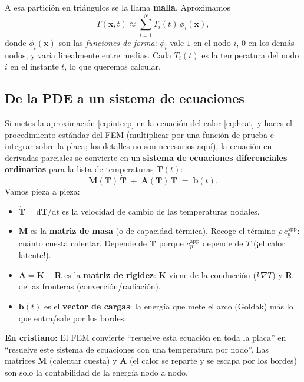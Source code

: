 \documentclass[11pt]{article}
\newcommand{\dd}{\mathrm{d}}
\newcommand{\grad}{\nabla}
\newcommand{\cpapp}{c_p^{\mathrm{app}}}
\theoremstyle{definition}
\theoremstyle{plain}
\newcommand{\dummies}[1]{%
  \par\smallskip\noindent
  \colorbox{yellow!18}{\parbox{\dimexpr\linewidth-2\fboxsep}{%
  \small\textbf{En cristiano:} #1}}\par\smallskip}
\begin{document}
A esa partición en triángulos se la llama \textbf{malla}. Aproximamos
\begin{equation}
  T(\bm x,t) \approx \sum_{i=1}^{N} T_i(t)\,\phi_i(\bm x),
  \label{eq:interp}
\end{equation}
donde $\phi_i(\bm x)$ son las \emph{funciones de forma}: $\phi_i$ vale $1$ en el
nodo $i$, $0$ en los demás nodos, y varía linealmente entre medias. Cada $T_i(t)$ es
la temperatura del nodo $i$ en el instante $t$, lo que queremos calcular.

\subsection{De la PDE a un sistema de ecuaciones}

Si metes la aproximación \eqref{eq:interp} en la ecuación del calor
\eqref{eq:heat} y haces el procedimiento estándar del FEM (multiplicar por una
función de prueba e integrar sobre la placa; los detalles no son necesarios aquí),
la ecuación en derivadas parciales se convierte en un \textbf{sistema de ecuaciones
diferenciales ordinarias} para la lista de temperaturas $\bm T(t)$:
\begin{equation}
  \bm M(\bm T)\,\dot{\bm T} \;+\; \bm A(\bm T)\,\bm T \;=\; \bm b(t).
  \label{eq:semidisc}
\end{equation}
Vamos pieza a pieza:
\begin{itemize}[leftmargin=1.5em]
  \item $\dot{\bm T}=\dd\bm T/\dd t$ es la velocidad de cambio de las temperaturas
  nodales.
  \item $\bm M$ es la \textbf{matriz de masa} (o de capacidad térmica). Recoge el
  término $\rho\,\cpapp$: cuánto cuesta calentar. Depende de $\bm T$ porque
  $\cpapp$ depende de $T$ (¡el calor latente!).
  \item $\bm A=\bm K+\bm R$ es la \textbf{matriz de rigidez}: $\bm K$ viene de la
  conducción ($k\grad T$) y $\bm R$ de las fronteras (convección/radiación).
  \item $\bm b(t)$ es el \textbf{vector de cargas}: la energía que mete el arco
  (Goldak) más lo que entra/sale por los bordes.
\end{itemize}

\dummies{El FEM convierte ``resuelve esta ecuación en toda la placa'' en
``resuelve este sistema de ecuaciones con una temperatura por nodo''. Las matrices
$\bm M$ (calentar cuesta) y $\bm A$ (el calor se reparte y se escapa por los
bordes) son solo la contabilidad de la energía nodo a nodo.}
\end{document}
